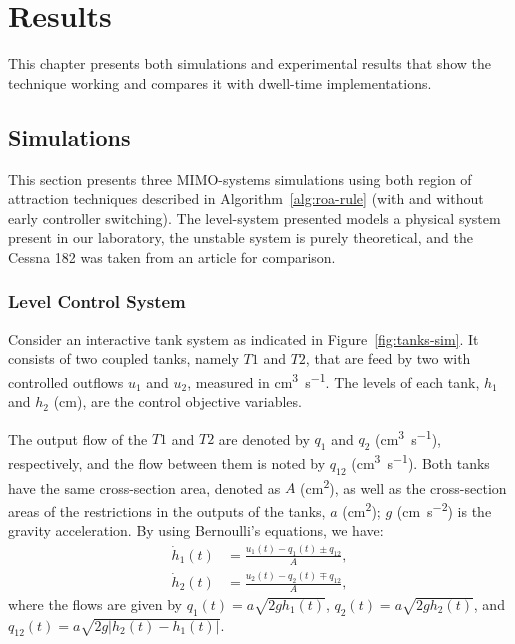 
\chapter{Results}%
\label{chp:results}

This chapter presents both simulations and experimental results that show the
technique working and compares it with dwell-time implementations.

\section{Simulations}%
\label{sec:simulation}

This section presents three MIMO-systems simulations using both region of
attraction techniques described in Algorithm~\ref{alg:roa-rule} (with and
without early controller switching). The level-system presented models a
physical system present in our laboratory, the unstable system is purely
theoretical, and the Cessna 182 was taken from an article for comparison.

\subsection{Level Control System}%
\label{subsec:tanks-system}

Consider an interactive tank system as indicated in Figure~\ref{fig:tanks-sim}.
It consists of two coupled tanks, namely \(T1\) and \(T2\), that are feed by two
with controlled outflows \(u_1\) and \(u_2\), measured in
\si{\cubic\centi\metre\per\second}. The levels of each tank, \(h_1\) and \(h_2\)
(\si{\centi\metre}), are the control objective variables.



The output flow of the \(T1\) and \(T2\) are denoted by \(q_1\) and \(q_2\)
(\si{\cubic\centi\metre\per\second}), respectively, and the flow between them is
noted by \(q_{12}\) (\si{\cubic\centi\metre\per\second}). Both tanks have the
same cross-section area, denoted as \(A\) (\si{\square\centi\metre}), as well as the
cross-section areas of the restrictions in the outputs of the tanks, \(a\)
(\si{\square\centi\metre}); \(g\) (\si{\centi\metre\per\square\second}) is the gravity
acceleration. By using Bernoulli's equations, we have:
%
\begin{equation}
  \label{eq:formula-height-variation-lin}
  \begin{aligned}
    \dot{h}_1(t) & = \frac{u_1(t)-q_1(t)\pm{}q_{12}}{A}, \\
    \dot{h}_2(t) & = \frac{u_2(t)-q_2(t)\mp{}q_{12}}{A},
  \end{aligned}
\end{equation}
%
where the flows are given by \(q_1(t) = a\sqrt{2gh_1(t)}\),
\(q_2(t) = a\sqrt{2gh_2(t)}\), and
\(q_{12}(t) = a\sqrt{2g\left|h_2(t)-h_1(t)\right|}\).

